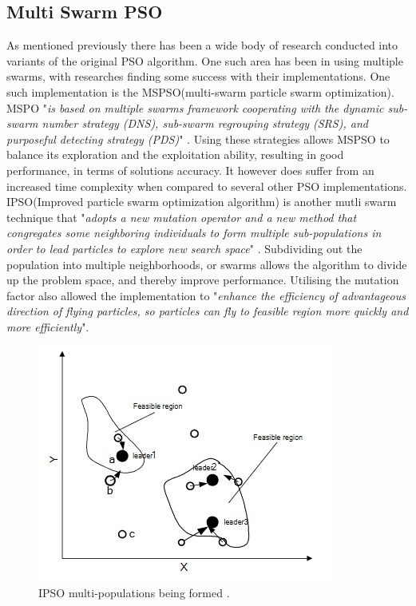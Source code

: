 \documentclass[oneside,12pt]{book}
\begin{document}
\subsection{Multi Swarm PSO}
As mentioned previously there has been a wide body of research conducted into variants of the original PSO algorithm. One such area has been in using multiple swarms, with researches finding some success with their implementations. One such implementation is the MSPSO(multi-swarm particle swarm optimization).  MSPO "\textit{is based on multiple swarms framework cooperating with the dynamic sub-swarm number strategy (DNS), sub-swarm regrouping strategy (SRS), and purposeful detecting strategy (PDS)}" \cite{XIA2018126}. Using these strategies allows MSPSO to balance its exploration and the exploitation ability, resulting in good performance, in terms of solutions accuracy. It however does suffer from an increased time complexity when compared to several other PSO implementations. 
IPSO(Improved  particle  swarm  optimization   algorithm) is another mutli swarm technique that "\textit{adopts   a   new   mutation  operator  and  a  new  method  that  congregates  some  neighboring  individuals  to  form  multiple  sub-populations  in  order  to  lead  particles  to  explore  new  search space}" \cite{zheng2007improved}. Subdividing out the population into multiple neighborhoods, or swarms allows the algorithm to divide up the problem space, and thereby improve performance. Utilising the mutation factor also allowed the implementation to "\textit{enhance the efficiency of advantageous direction of flying particles, so particles can fly to feasible region more quickly and more efficiently}".
\begin{figure}[H]
    \centering
    \includegraphics[scale=1.0]{Images/IpsoFormingSwarms.png}
    \caption{IPSO multi-populations being formed .\protect\cite{zheng2007improved} }
    \label{fig:IPSO multi-populations being formed.}
\end{figure}
\end{document}
